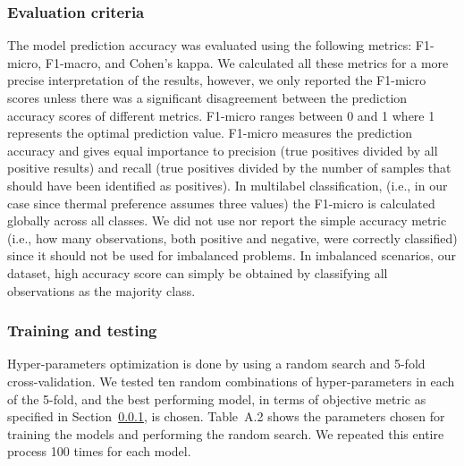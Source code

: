\subsubsection{Evaluation criteria}\label{subsubsec:evaluation-criteria}
The model prediction accuracy was evaluated using the following metrics: F1-micro, F1-macro, and Cohen's kappa.
We calculated all these metrics for a more precise interpretation of the results, however, we only reported the F1-micro scores unless there was a significant disagreement between the prediction accuracy scores of different metrics.
F1-micro ranges between 0 and 1 where 1 represents the optimal prediction value.
F1-micro measures the prediction accuracy and gives equal importance to precision (true positives divided by all positive results) and recall (true positives divided by the number of samples that should have been identified as positives).
In multilabel classification, (i.e., in our case since thermal preference assumes three values) the F1-micro is calculated globally across all classes.
We did not use nor report the simple accuracy metric (i.e., how many observations, both positive and negative, were correctly classified) since it should not be used for imbalanced problems.
In imbalanced scenarios, our dataset, high accuracy score can simply be obtained by classifying all observations as the majority class.

\subsubsection{Training and testing}\label{subsubsec:train-test}
Hyper-parameters optimization is done by using a random search and 5-fold cross-validation.
We tested ten random combinations of hyper-parameters in each of the 5-fold, and the best performing model, in terms of objective metric as specified in Section~\ref{subsubsec:evaluation-criteria}, is chosen.
Table~A.2 shows the parameters chosen for training the models and performing the random search.
We repeated this entire process 100 times for each model.